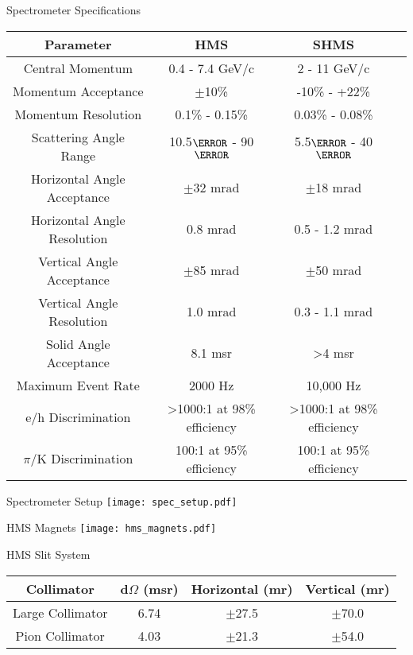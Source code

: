 \begin{Mtable}{Spectrometer Specifications}
  \centering
  \begin{tabular}{|c|c|c|c|}
    \hline
    \textbf{Parameter} & \textbf{HMS} & \textbf{SHMS}\\
    \hline
    Central Momentum & 0.4 - 7.4 GeV/c & 2 - 11 GeV/c \\
    Momentum Acceptance & $\pm$10\% & -10\% - +22\% \\
    Momentum Resolution & 0.1\% - 0.15\% & 0.03\% - 0.08\% \\
    Scattering Angle Range & 10.5$\degree$ - 90$\degree$ & 5.5$\degree$ - 40$\degree$ \\
    \hline
    Horizontal Angle Acceptance & $\pm$32 mrad & $\pm$18 mrad \\
    Horizontal Angle Resolution & 0.8 mrad & 0.5 - 1.2 mrad \\
    Vertical Angle Acceptance & $\pm$85 mrad & $\pm$50 mrad \\
    Vertical Angle Resolution & 1.0 mrad & 0.3 - 1.1 mrad \\
    Solid Angle Acceptance & 8.1 msr & >4 msr \\
    \hline
    Maximum Event Rate & 2000 Hz & 10,000 Hz \\
    e/h Discrimination & >1000:1 at 98\% efficiency & >1000:1 at 98\% efficiency \\
    $\pi$/K Discrimination & 100:1 at 95\% efficiency & 100:1 at 95\% efficiency \\
    \hline
  \end{tabular}
  \caption{Break down of the HMS and SHMS specifications and capablilities..}  
  \label{tab:2-4_spectrometer}
\end{Mtable}

\begin{Mfigure}{Spectrometer Setup}
  \centering
  \texttt{[image: spec\_setup.pdf]}
  \caption{Overview of Hall C Spectrometer setup.}
  \label{fig:2-4_spec_setup}
\end{Mfigure}

\begin{Mfigure}{HMS Magnets}
  \centering
  \texttt{[image: hms\_magnets.pdf]}
  \caption{Overview of HMS optical setup.}
  \label{fig:2-4_hms_magnets}
\end{Mfigure}

\begin{Mtable}{HMS Slit System}
  \centering
  \begin{tabular}{|c|c|c|c|}
    \hline
    \textbf{Collimator} & \textbf{d$\Omega$ (msr)} & \textbf{Horizontal (mr)} & \textbf{Vertical (mr)} \\
    \hline
    Large Collimator & 6.74 & $\pm$27.5 & $\pm$70.0 \\
    Pion Collimator & 4.03 & $\pm$21.3 & $\pm$54.0 \\
    \hline
  \end{tabular}
  \caption{Breakdown of HMS slit system's apertures.}
  \label{tab:2-4_hms_slit}
\end{Mtable}

